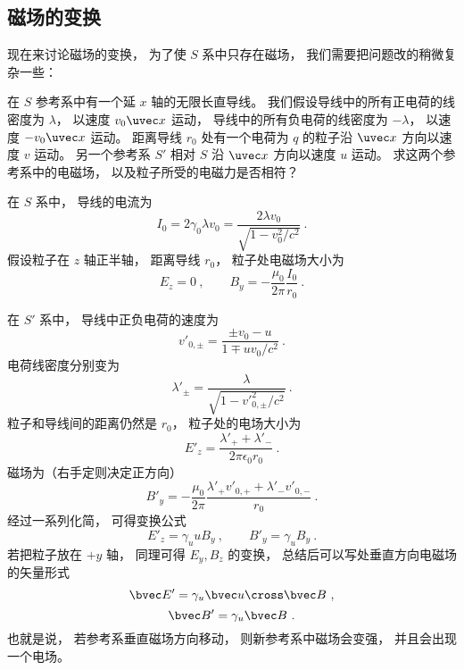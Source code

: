 
\subsection{磁场的变换}
现在来讨论磁场的变换， 为了使 $S$ 系中只存在磁场， 我们需要把问题改的稍微复杂一些：

在 $S$ 参考系中有一个延 $x$ 轴的无限长直导线。 我们假设导线中的所有正电荷的线密度为 $\lambda$， 以速度 $v_0\uvec x$ 运动， 导线中的所有负电荷的线密度为 $-\lambda$，  以速度 $-v_0\uvec x$ 运动。 距离导线 $r_0$ 处有一个电荷为 $q$ 的粒子沿 $\uvec x$ 方向以速度 $v$ 运动。 另一个参考系 $S'$ 相对 $S$ 沿 $\uvec x$ 方向以速度 $u$ 运动。 求这两个参考系中的电磁场， 以及粒子所受的电磁力是否相符？

在 $S$ 系中， 导线的电流为
\begin{equation}
I_0 = 2 \gamma_0 \lambda v_0 = \frac{2 \lambda v_0}{\sqrt{1 - v_0^2/c^2}}~.
\end{equation}
假设粒子在 $z$ 轴正半轴， 距离导线 $r_0$， 粒子处电磁场大小为
\begin{equation}
E_z = 0 ~,\qquad B_y = -\frac{\mu_0}{2\pi} \frac{I_0}{r_0}~.
\end{equation}

在 $S'$ 系中， 导线中正负电荷的速度为
\begin{equation}
v'_{0, \pm} = \frac{\pm v_0-u}{1 \mp uv_0/c^2}~.
\end{equation}
电荷线密度分别变为
\begin{equation}
\lambda'_\pm = \frac{\lambda}{\sqrt{1 - v'^2_{0,\pm}/c^2}}~.
\end{equation}
粒子和导线间的距离仍然是 $r_0$， 粒子处的电场大小为
\begin{equation}
E'_z = \frac{\lambda'_+ + \lambda'_-}{2 \pi \epsilon_{0} r_0}~.
\end{equation}
磁场为（右手定则决定正方向）
\begin{equation}
B'_y = -\frac{\mu_0}{2\pi} \frac{\lambda'_+ v'_{0,+} + \lambda'_- v'_{0,-}}{r_0}~.
\end{equation}
经过一系列化简， 可得变换公式
\begin{equation}
E'_z = \gamma_u u B_y~,
\qquad
B'_y = \gamma_u B_y~.
\end{equation}
若把粒子放在 $+y$ 轴， 同理可得 $E_y, B_z$ 的变换， 总结后可以写处垂直方向电磁场的矢量形式
\begin{equation}\label{eq_EMRef_3}
\bvec E' = \gamma_u \bvec u \cross \bvec B~,
\end{equation}
\begin{equation}\label{eq_EMRef_4}
\bvec B' = \gamma_u \bvec B~.
\end{equation}
也就是说， 若参考系垂直磁场方向移动， 则新参考系中磁场会变强， 并且会出现一个电场。

